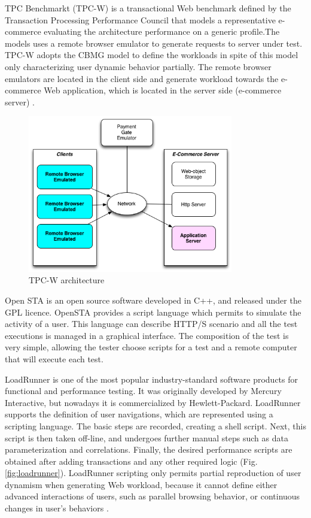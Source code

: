 TPC Benchmarkt (TPC-W) is a transactional Web benchmark defined by the Transaction Processing Performance Council that models a representative e-commerce evaluating the architecture performance on a generic profile.The models uses a remote browser emulator to generate requests to server under test. TPC-W adopts the CBMG model to define the workloads in spite of this model only characterizing user dynamic behavior partially. The remote browser emulators are located in the client side and generate workload towards the e-commerce Web application, which is located in the server side (e-commerce server) \cite{MohammadS.Obaidat} \cite{Menasce2002a}.

\begin{figure}[h]
\centering
\includegraphics[width=0.8\textwidth]{./images/tpcw.png}
\caption{TPC-W architecture \cite{MohammadS.Obaidat} \cite{Menasce2002a}}
\label{fig:tpcw}
\end{figure}


Open STA is an open source software developed in C++, and released under the GPL licence. OpenSTA provides a script language which permits to simulate the activity of a user. This language can describe HTTP/S scenario and all the test executions is managed in a graphical interface. The composition of the test is
very simple, allowing the tester choose scripts for a test and a remote computer that will execute each test.


LoadRunner is one of the most popular industry-standard software products for functional and performance testing. It was originally developed by Mercury Interactive, but nowadays it is commercialized by Hewlett-Packard. LoadRunner supports the definition of user navigations, which are represented using a scripting language. The basic steps are recorded, creating a shell script. Next, this script is then taken off-line, and undergoes further manual steps such as data parameterization and correlations. Finally, the desired performance scripts are obtained after adding transactions and any other required logic (Fig. \ref{fig:loadrunner}). LoadRunner scripting only permits partial reproduction of user dynamism when generating Web workload, because it cannot define either advanced interactions of users, such as parallel browsing behavior, or continuous changes in user’s behaviors \cite{MohammadS.Obaidat}.

